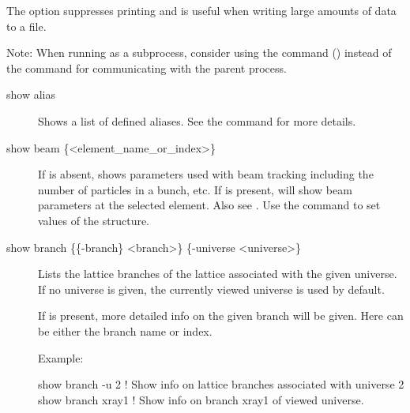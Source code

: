 {{{The  option suppresses printing and is useful when writing
large amounts of data to a file.

Note: When running \tao as a subprocess, consider using the
 command () instead of the  command
for communicating with the parent process.



\begin{description}

\item[show alias] \Newline

\vskip -0.2in

Shows a list of defined aliases. See the  command for more
details.


\item[show beam \{<element\_name\_or\_index>\}] \Newline

\vskip -0.2in

If  is absent,  shows
parameters used with beam tracking including the number of particles
in a bunch, etc.  If  is present,  will show beam parameters at the selected element. Also see
.  Use the  command to set values
of the  structure.


\item[show branch \{\{-branch\} <branch>\} \{-universe <universe>\}] \Newline

\vskip -0.2in

Lists the lattice branches of the lattice associated with the given universe.
If no universe is given, the currently viewed universe is used by default.

If  is present, more detailed info on the given branch
will be given. Here  can be either the branch name or index.

Example:
\begin{example}
  show branch -u 2     ! Show info on lattice branches associated with universe 2
  show branch xray1    ! Show info on branch xray1 of viewed universe.
\end{example}


\end{description}}}}
